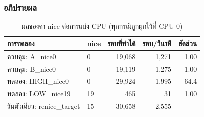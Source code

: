 \documentclass[a4paper,11pt]{article}
\begin{document}
\subsubsection{อภิปรายผล}

\begin{table}[H]
\centering\small
\caption{ผลของค่า nice ต่อการแบ่ง CPU (ทุกกรณีถูกผูกไว้ที่ CPU 0)}
\begin{tabular}{llrrr}
\toprule
\textbf{การทดลอง} & \textbf{nice} & \textbf{รอบที่ทำได้} & \textbf{รอบ/วินาที} & \textbf{สัดส่วน} \\
\midrule
ควบคุม: A\_nice0   & 0  & 19{,}068 & 1{,}271 & 1.00 \\
ควบคุม: B\_nice0   & 0  & 19{,}119 & 1{,}275 & 1.00 \\
\addlinespace
ทดลอง: HIGH\_nice0 & 0  & 29{,}924 & 1{,}995 & 64.4 \\
ทดลอง: LOW\_nice19 & 19 & \phantom{00}465 & \phantom{0,00}31 & 1.00 \\
\addlinespace
รันตัวเดียว: renice\_target & 15 & 30{,}658 & 2{,}555 & --- \\
\bottomrule
\end{tabular}
\end{table}
\end{document}

